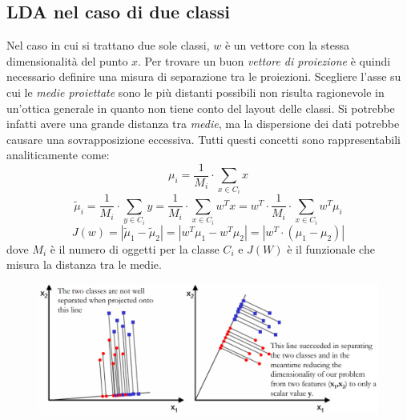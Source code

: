 \documentclass[a4paper,oneside,titlepage]{book}
\begin{document}
\subsection{LDA nel caso di due classi}
Nel caso in cui si trattano due sole classi, $w$ è un vettore con la stessa dimensionalità del punto $x$. Per trovare un buon \textit{vettore di proiezione} è quindi necessario definire una misura di separazione tra le proiezioni. Scegliere l'asse su cui le \textit{medie proiettate} sono le più distanti possibili non risulta ragionevole in un'ottica generale in quanto non tiene conto del layout delle classi. Si potrebbe infatti avere una grande distanza tra \textit{medie}, ma la dispersione dei dati potrebbe causare una sovrapposizione eccessiva. Tutti questi concetti sono rappresentabili analiticamente come:
\[ \mu_i = \frac{1}{M_i} \cdot \sum_{x \in C_i} x \]
\[ \tilde{\mu}_i = \frac{1}{M_i} \cdot \sum_{y \in C_i} y = \frac{1}{M_i} \cdot \sum_{x \in C_i} w^T x = w^T \cdot \frac{1}{M_i} \cdot \sum_{x \in C_i} w^T \mu_i \]
\[ J(w) = |\tilde{\mu}_1 - \tilde{\mu}_2| = |w^T \mu_1 - w^T \mu_2| = |w^T \cdot (\mu_1 - \mu_2)| \]
dove $M_i$ è il numero di oggetti per la classe $C_i$ e $J(W)$ è il funzionale che misura la distanza tra le medie.
\begin{figure}[htp]
	\centering
	\includegraphics[width=\textwidth, height=\textheight, keepaspectratio]{lda1.png}
\end{figure}
\end{document}
